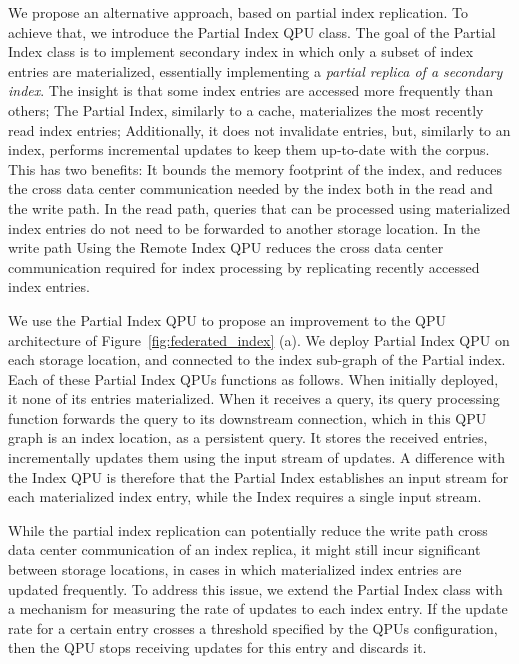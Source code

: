 We propose an alternative approach, based on partial index replication.
To achieve that, we introduce the Partial Index QPU class.
The goal of the Partial Index class is to implement secondary index in which only a subset of index entries are materialized,
essentially implementing a \textit{partial replica of a secondary index}.
The insight is that some index entries are accessed more frequently than others;
The Partial Index, similarly to a cache, materializes the most recently read index entries;
Additionally, it does not invalidate entries, but, similarly to an index, performs incremental updates to keep them up-to-date
with the corpus.
This has two benefits:
It bounds the memory footprint of the index, and reduces the cross data center communication needed by the index both in the read and the write path.
In the read path, queries that can be processed using materialized index entries do not need to be forwarded to
another storage location.
In the write path
Using the Remote Index QPU reduces the cross data center communication required for index processing by
replicating recently accessed index entries.

We use the Partial Index QPU to propose an improvement to the QPU architecture of Figure~\ref{fig:federated_index} (a).
We deploy Partial Index QPU on each storage location, and connected to the index sub-graph of the Partial index.
Each of these Partial Index QPUs functions as follows.
When initially deployed, it none of its entries materialized.
When it receives a query, its query processing function forwards the query to its downstream connection,
which in this QPU graph is an index location, as a persistent query.
It stores the received entries, incrementally updates them using the input stream of updates.
A difference with the Index QPU is therefore that the Partial Index establishes an input stream for each materialized
index entry, while the Index requires a single input stream.

\medskip
\noindent
While the partial index replication can potentially reduce the write path cross data center communication of an index replica,
it might still incur significant between storage locations,
in cases in which materialized index entries are updated frequently.
To address this issue,
we extend the Partial Index class with a mechanism for measuring the rate of updates to each index entry.
If the update rate for a certain entry crosses a threshold specified by the QPUs configuration,
then the QPU stops receiving updates for this entry and discards it.

